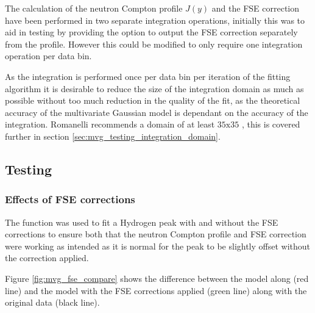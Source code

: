 \documentclass[a4paper]{article}
\begin{document}
The calculation of the neutron Compton profile $J(y)$ and the \gls*{FSE}
correction have been performed in two separate integration operations, initially
this was to aid in testing by providing the option to output the \gls*{FSE}
correction separately from the profile. However this could be modified to only
require one integration operation per data bin.

As the integration is performed once per data bin per iteration of the fitting
algorithm it is desirable to reduce the size of the integration domain as much
as possible without too much reduction in the quality of the fit, as the
theoretical accuracy of the multivariate Gaussian model is dependant on the
accuracy of the integration. Romanelli recommends a domain of at least
$\mathrm{35x35}$ \cite{Romanelli2015}, this is covered further in section
\ref{sec:mvg_testing_integration_domain}.

\subsection{Testing}
\label{sec:mvg_testing}

\subsubsection{Effects of \gls*{FSE} corrections}

The function was used to fit a Hydrogen peak with and without the \gls*{FSE}
corrections to ensure both that the neutron Compton profile and \gls*{FSE}
correction were working as intended as it is normal for the peak to be slightly
offset without the correction applied.

Figure \ref{fig:mvg_fse_compare} shows the difference between the model along
(red line) and the model with the \gls*{FSE} corrections applied (green line)
along with the original data (black line).
\end{document}
